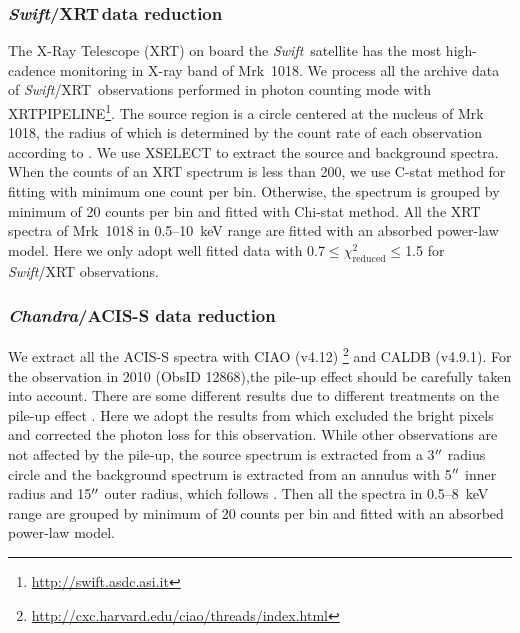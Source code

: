 \documentclass[twocolumn]{aastex63}
\newcommand{\chandra}{{\em Chandra}}
\newcommand{\swift}{{\small \it Swift}}
\newcommand{\xrt}{{\small {\it Swift}/XRT}}
\begin{document}
\subsubsection{\xrt\,data reduction}
\label{data-xrt}
The X-Ray Telescope (XRT) on board the \swift\, satellite has the most high-cadence monitoring in X-ray band of Mrk~1018. We process all the archive data of \xrt\, observations performed in photon counting mode with {\scriptsize XRTPIPELINE}\footnote{\url{http://swift.asdc.asi.it}}. The source region is a circle centered at the nucleus of Mrk 1018, the radius of which is determined by the count rate of each observation according to \citet{2009MNRAS.397.1177E}. We use {\scriptsize XSELECT} to extract the source and background spectra. When the counts of an XRT spectrum is less than 200, we use C-stat method for fitting with minimum one count per bin. Otherwise, the spectrum is grouped by minimum of 20 counts per bin and fitted with Chi-stat method. All the XRT spectra of Mrk~1018 in 0.5--10~keV range are fitted with an absorbed power-law model. Here we only adopt well fitted data with 0.7$\le \chi^2_\mathrm{reduced} \le$1.5 for \swift/XRT observations. 







\subsubsection{\chandra/ACIS-S data reduction}
We extract all the ACIS-S spectra with CIAO (v4.12) \footnote{\url{http://cxc.harvard.edu/ciao/threads/index.html}} and {\scriptsize CALDB} (v4.9.1).  For the observation in 2010 (ObsID 12868),the pile-up effect should be carefully taken into account. There are some different results due to different treatments on the pile-up effect \citep[see ][]{2016A&A...593L...9H,2017ApJ...840...11L,2017A&A...607L...9K}. Here we adopt the results from \citet{2016A&A...593L...9H} which excluded the bright pixels and  corrected the photon loss for this observation. While other observations are not affected by the pile-up, the source spectrum is extracted from a 3$\mbox{$^{\prime\prime}$}$ radius circle and the background spectrum is extracted from an annulus with 5$\mbox{$^{\prime\prime}$}$ inner radius and 15$\mbox{$^{\prime\prime}$}$ outer radius, which follows \citet{2017ApJ...840...11L}. Then all the spectra in 0.5--8~keV range are grouped by minimum of 20 counts per bin and fitted with an absorbed power-law model. 
\end{document}
